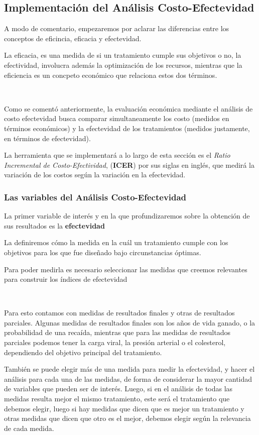 \documentclass{article}
\begin{document}
\subsection{Implementación del Análisis Costo-Efectevidad}

A modo de comentario, empezaremos por aclarar las diferencias entre los conceptos de eficincia, eficacia y efectevidad.

La eficacia, es una medida de si un tratamiento cumple sus objetivos o no, la efectividad, involucra además la optimización de los recursos, mientras que la eficiencia es un concpeto económico que relaciona estos dos términos.

\

Como se comentó anteriormente, la evaluación económica mediante el análisis de costo efectevidad busca comparar simultaneamente los costo (medidos en términos económicos) y la efectevidad de los tratamientos (medidos justamente, en términos de efectevidad).

La herramienta que se implementará a lo largo de esta sección es el \textit{Ratio Incremental de Costo-Efectividad}, (\textbf{ICER}) por sus siglas en inglés, que medirá la variación de los costos según la variación en la efectevidad.

\subsubsection{Las variables del Análisis Costo-Efectevidad}

La primer variable de interés y en la que profundizaremos sobre la obtención de sus resultados es la \textbf{efectevidad}

La definiremos cómo la medida en la cuál un tratamiento cumple con los objetivos para los que fue diseñado bajo circunstancias óptimas.

Para poder medirla es necesario seleccionar las medidas que creemos relevantes para construir los índices de efectevidad

\

Para esto contamos con medidas de resultados finales y otras de resultados parciales. Algunas medidas de resultados finales son los años de vida ganado, o la probabilidad de una recaída, mientras que para las medidas de resultados parciales podemos tener la carga viral, la presión arterial o el colesterol, dependiendo del objetivo principal del tratamiento.
\

También se puede elegir más de una medida para medir la efectevidad, y hacer el análisis para cada una de las medidas, de forma de considerar la mayor cantidad de variables que pueden ser de interés.
Luego, si en el análisis de todas las medidas resulta mejor el mismo tratamiento, este será el tratamiento que debemos elegir, luego si hay medidas que dicen que es mejor un tratamiento y otras medidas que dicen que otro es el mejor, debemos elegir según la relevancia de cada medida.
\end{document}
